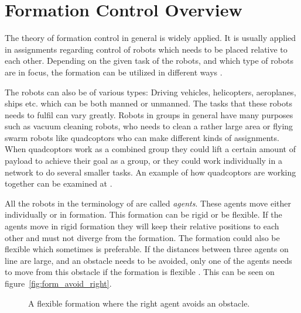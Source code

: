 \chapter{Formation Control Overview}
\label{ch:formcontrol}


The theory of formation control in general is widely applied. It is usually applied in assignments regarding control of robots which needs to be placed relative to each other. Depending on the given task of the robots, and which type of robots are in focus, the formation can be utilized in different ways \citep{muv-survey1}.

The robots can also be of various types: Driving vehicles, helicopters, aeroplanes, ships etc. which can be both manned or unmanned. The tasks that these robots needs to fulfil can vary greatly. Robots in groups in general have many purposes such as vacuum cleaning robots, who needs to clean a rather large area or flying swarm robots like quadcoptors who can make different kinds of assignments. When quadcoptors work as a combined group they could lift a certain amount of payload to achieve their goal as a group, or they could work individually in a network to do several smaller tasks. An example of how quadcoptors are working together can be examined at \citep{ethswarm}.

All the robots in the terminology of \cite{muv-survey} are called \textit{agents}. These agents move either individually or in formation. This formation can be rigid or be flexible. If the agents move in rigid formation they will keep their relative positions to each other and must not diverge from the formation. The formation could also be flexible which sometimes is preferable. If the distances between three agents on line are large, and an obstacle needs to be avoided, only one of the agents needs to move from this obstacle if the formation is flexible \citep{muv-survey}. This can be seen on figure~\vref{fig:form_avoid_right}.
\begin{figure}[htbp]
	\centering
	
	\caption{A flexible formation where the right agent avoids an obstacle.}
	\label{fig:form_avoid_right}
\end{figure}

